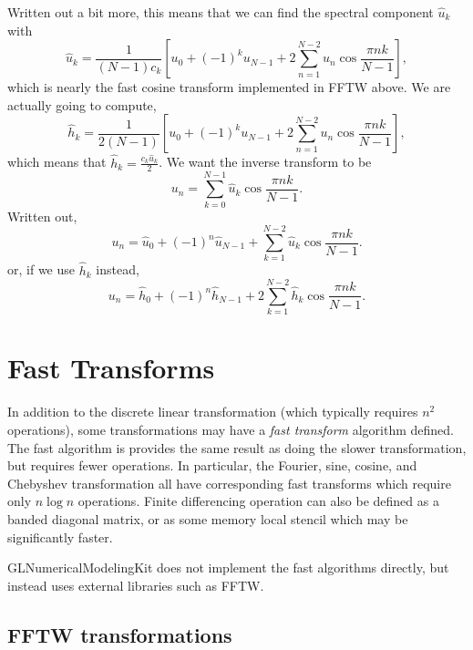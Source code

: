 \documentclass[11pt]{article}
\begin{document}
Written out a bit more, this means that we can find the spectral component $\hat{u}_k$ with
\begin{equation}
\hat{u}_k = \frac{1}{(N-1) c_k} \left[ u_0 + (-1)^{k} u_{N-1} +  2 \sum_{n=1}^{N-2} u_n \cos\frac{\pi n k}{N-1} \right],
\end{equation}
which is nearly the fast cosine transform implemented in FFTW above. We are actually going to compute,
\begin{equation}
\hat{h}_k = \frac{1}{2(N-1)} \left[ u_0 + (-1)^{k} u_{N-1} +  2 \sum_{n=1}^{N-2} u_n \cos\frac{\pi n k}{N-1} \right],
\end{equation}
which means that $\hat{h}_k = \frac{c_k \hat{u}_k}{2}$. We want the inverse transform to be
\begin{equation}
u_n = \sum_{k=0}^{N-1} \hat{u}_k \cos \frac{\pi n k}{N-1}.
\end{equation}
Written out,
\begin{equation}
u_n = \hat{u}_0 + (-1)^{n}   \hat{u}_{N-1} + \sum_{k=1}^{N-2} \hat{u}_k \cos \frac{\pi n k}{N-1}.
\end{equation}
or, if we use $\hat{h}_k$ instead,
\begin{equation}
u_n = \hat{h}_0 + (-1)^{n} \hat{h}_{N-1} + 2 \sum_{k=1}^{N-2} \hat{h}_k \cos \frac{\pi n k}{N-1}.
\end{equation}

%
%
\section{Fast Transforms}

In addition to the discrete linear transformation (which typically requires $n^2$ operations), some transformations may have a \emph{fast transform} algorithm defined. The fast algorithm is provides the same result as doing the slower transformation, but requires fewer operations. In particular, the Fourier, sine, cosine, and Chebyshev transformation all have corresponding fast transforms which require only $n \log n$ operations. Finite differencing operation can also be defined as a banded diagonal matrix, or as some memory local stencil which may be significantly faster.

GLNumericalModelingKit does not implement the fast algorithms directly, but instead uses external libraries such as FFTW.

\subsection{FFTW transformations}
\end{document}
